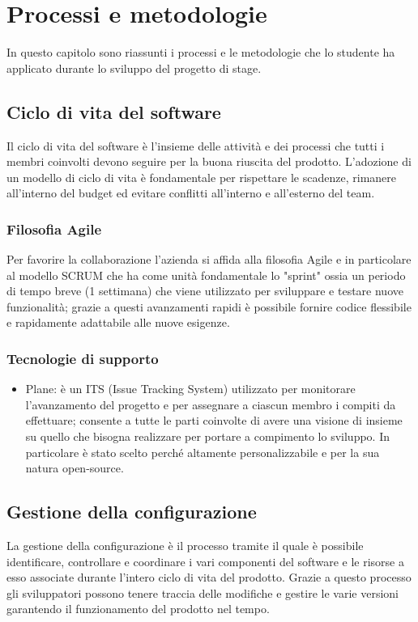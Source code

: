 \chapter{Processi e metodologie}
\label{cap:processi-metodologie}

In questo capitolo sono riassunti i processi e le metodologie che lo studente ha applicato durante lo sviluppo del progetto di stage. 


\section{Ciclo di vita del software}
Il ciclo di vita del software è l'insieme delle attività e dei processi che tutti i membri coinvolti devono seguire per la buona riuscita del prodotto.
L'adozione di un modello di ciclo di vita è fondamentale per rispettare le scadenze, rimanere all'interno del budget ed evitare conflitti all'interno e all'esterno del team.

\subsection{Filosofia Agile}
Per favorire la collaborazione l'azienda si affida alla filosofia Agile e in particolare al modello SCRUM che ha come unità fondamentale lo "sprint" ossia un periodo di tempo breve (1 settimana) che viene utilizzato per sviluppare e testare nuove funzionalità; grazie a questi avanzamenti rapidi è possibile fornire codice flessibile e rapidamente adattabile alle nuove esigenze. 

\subsection{Tecnologie di supporto}
\begin{itemize}
    \item Plane: è un ITS (Issue Tracking System) utilizzato per monitorare l'avanzamento del progetto e per assegnare a ciascun membro i compiti da effettuare; consente a tutte le parti coinvolte di avere una visione di insieme su quello che bisogna realizzare per portare a compimento lo sviluppo. In particolare è stato scelto perché altamente personalizzabile e per la sua natura open-source.
\end{itemize}

\section{Gestione della configurazione}
La gestione della configurazione è il processo tramite il quale è possibile identificare, controllare e coordinare i vari componenti del software e le risorse a esso associate durante l'intero ciclo di vita del prodotto. Grazie a questo processo gli sviluppatori possono tenere traccia delle modifiche e gestire le varie versioni garantendo il funzionamento del prodotto nel tempo.

